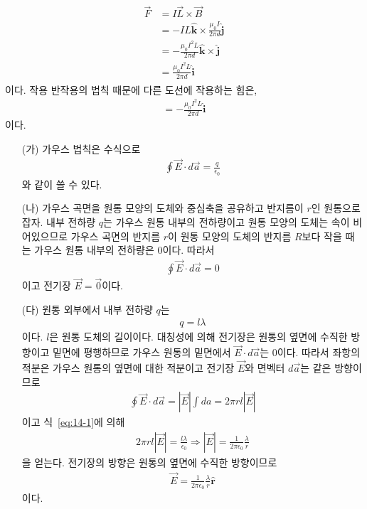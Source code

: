 \documentclass[tightenlines,floatfix,nofootinbib,superscriptaddress,fleqn]{revtex4}
\begin{document}
\begin{itemize}
\begin{align}
    \begin{split}
      \vec{F}&=I\vec{L}\times \vec{B}\\
      &=-IL\hat{\bm{k}}\times \frac{\mu_0 I}{2\pi d}\hat{\bm{j}}\\
      &=-\frac{\mu_0 I^2L}{2\pi d}\hat{\bm{k}}\times\hat{\bm{j}}\\
      &=\frac{\mu_0 I^2L}{2\pi d}\hat{\bm{i}}
    \end{split}
  \end{align}
이다. 작용 반작용의 법칙 때문에 다른 도선에 작용하는 힘은,
\begin{align}
  =-\frac{\mu_0 I^2L}{2\pi d}\hat{\bm{i}}
\end{align}
이다.
\end{itemize}

\begin{itemize}
  \item[(가)]
  가우스 법칙은 수식으로
  \begin{align}\label{eq:14-1}
    \oint \vec{E}\cdot d\vec{a} =\frac{q}{\epsilon_0}
  \end{align}
  와 같이 쓸 수 있다.
  \item[(나)]
  가우스 곡면을 원통 모양의 도체와 중심축을 공유하고 반지름이 $r$인 원통으로 잡자. 
  내부 전하량 $q$는 가우스 원통 내부의 전하량이고 원통 모양의 도체는 속이 비어있으므로
  가우스 곡면의 반지름 $r$이 원통 모양의 도체의 반지름 $R$보다 작을 때는 가우스 원통 내부의
  전하량은 $0$이다. 따라서 
  \begin{align}
    \oint \vec{E}\cdot d\vec{a} = 0
  \end{align}
  이고 전기장 $\vec{E}=\vec{0}$이다.
  \item[(다)] 원통 외부에서 내부 전하량 $q$는
  \begin{align}
    q = l \lambda
  \end{align}
  이다. $l$은 원통 도체의 길이이다. 대칭성에 의해 전기장은 원통의 옆면에 수직한 방향이고 
  밑면에 평행하므로 가우스 원통의 밑면에서 $\vec{E}\cdot d\vec{a}$는 $0$이다. 따라서 
  좌항의 적분은 가우스 원통의 옆면에 대한 적분이고 전기장 $\vec{E}$와 면벡터 $d\vec{a}$는 
  같은 방향이므로
  \begin{align}
    \oint \vec{E}\cdot d\vec{a} = \left|\vec{E}\right|\int da
    =2\pi r l \left|\vec{E}\right|
  \end{align}
  이고 식~\eqref{eq:14-1}에 의해
  \begin{align}
    2\pi r l \left|\vec{E}\right| = \frac{l \lambda}{\epsilon_0}\Longrightarrow
    \left|\vec{E}\right| = \frac{1}{2\pi\epsilon_0}\frac{\lambda}{r}
  \end{align}
  을 얻는다. 전기장의 방향은 원통의 옆면에 수직한 방향이므로 
  \begin{align}
    \vec{E} = \frac{1}{2\pi\epsilon_0}\frac{\lambda}{r}\hat{\bm r}
  \end{align}
  이다.
\end{itemize}
\end{document}

